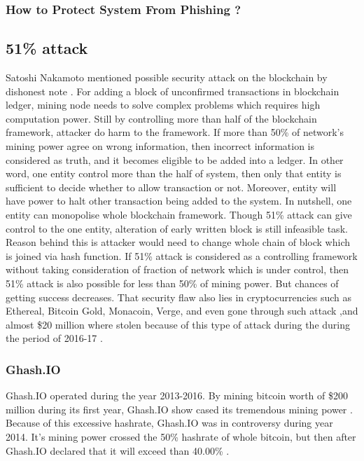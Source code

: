 \documentclass[a4paper,twoside,12pt]{report}
\begin{document}
\begin{spacing}{1.5}
\subsubsection{How to Protect System From Phishing ?}
\cite{blockchainthreatreport}
\subsection{51\% attack}
\label{51attack}
Satoshi Nakamoto mentioned possible security attack on the blockchain by dishonest note \cite{satoshinakamoto}. For adding a block of unconfirmed transactions in blockchain ledger, mining node needs to solve complex problems which requires high computation power. Still by controlling more than half of the blockchain framework, attacker do harm to the framework. If more than 50\% of network's mining power agree on wrong information, then incorrect information is considered as truth, and it becomes eligible to be added into a ledger. In other word, one entity control more than the half of system, then only that entity is sufficient to decide whether to allow transaction or not. Moreover, entity will have power to halt other transaction being added to the system. In nutshell, one entity can monopolise whole blockchain framework. Though 51\% attack can give control to the one entity, alteration of early written block is still infeasible task. Reason behind this is attacker would need to change whole chain of block which is joined via hash function. If 51\% attack is considered as a controlling framework without taking consideration of fraction of network which is under control, then 51\% attack is also possible for less than 50\% of mining power. But chances of getting success decreases. That security flaw also lies in cryptocurrencies such as Ethereal, Bitcoin Gold, Monacoin, Verge, and even gone through such attack ,and almost \$20 million where stolen because of this type of attack during the during the period of 2016-17 \cite{topfiveblockchainsecurityissues,51attackonline}.

\subsubsection{Ghash.IO}
Ghash.IO operated during the year 2013-2016. By mining bitcoin worth of \$200 million during its first year, Ghash.IO show cased its tremendous mining power \cite{wiki:ghash.IO}. Because of this excessive hashrate, Ghash.IO was in controversy during year 2014. It's mining power crossed the 50\% hashrate of whole bitcoin, but then after Ghash.IO declared that it will exceed than 40.00\% \cite{wiki:ghash.IO}. 

\end{spacing}
\end{document}
